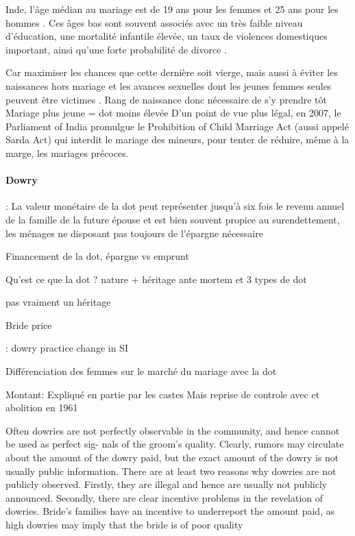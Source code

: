 \documentclass[a4paper, 11pt, onecolumn]{article}
\begin{document}
Inde, l’âge médian au mariage est de 19 ans pour les femmes et 25
ans pour les hommes \cite{Paswan2016}.
Ces âges bas sont souvent associés avec un très faible niveau d’éducation, une mortalité
infantile élevée, un taux de violences domestiques important, ainsi qu’une forte probabilité de
divorce \cite{Field2008, Singh1996}.

Car
maximiser les chances que
cette dernière soit vierge, mais aussi à éviter les naissances hors mariage et les avances sexuelles
dont les jeunes femmes seules peuvent être victimes  \citep{Jensen2003}.
Rang de naissance donc nécessaire de s'y prendre tôt
Mariage plus jeune = dot moins élevée \cite{Jensen2003}
D’un point de vue plus légal, en 2007, le Parliament of India promulgue le Prohibition of
Child Marriage Act (aussi appelé Sarda Act) qui interdit le mariage des mineurs, pour tenter de
réduire, même à la marge, les mariages précoces.

\paragraph{Dowry}
\citep{Deolalikar1998} : La valeur monétaire de la dot peut représenter jusqu’à six fois le revenu
annuel de la famille de la future épouse et est bien souvent propice au surendettement, les
ménages ne disposant pas toujours de l’épargne nécessaire

Financement de la dot, épargne vs emprunt \cite{Caldwell1983, Corno2016}

Qu'est ce que la dot ? nature \cite{Caplan1984} + héritage ante mortem et 3 types de dot \cite{Tambiah1989} 

\cite{Dalmia2005} pas vraiment un héritage

Bride price \cite{Dalmia2005}

\cite{Srinivasan2005} : dowry practice change in SI

Différenciation des femmes sur le marché du mariage avec la dot \cite{Becker1991}

Montant: \cite{Dalmia2005}
Expliqué en partie par les castes \citep{Dalmia2005, Anderson2003}
Mais reprise de controle avec \cite{Jejeebhoy2005} et abolition en 1961

\cite{Bloch2004}
Often dowries are not perfectly observable in the community, and hence cannot be used as perfect sig-
nals of the groom's quality. Clearly, rumors may circulate about the amount of the dowry paid, but the exact
amount of the dowry is not usually public information. There are at least two reasons why dowries are not
publicly observed. Firstly, they are illegal and hence are usually not publicly announced. Secondly, there are
clear incentive problems in the revelation of dowries. Bride's families have an incentive to underreport
the amount paid, as high dowries may imply that the bride is of poor quality
\end{document}
